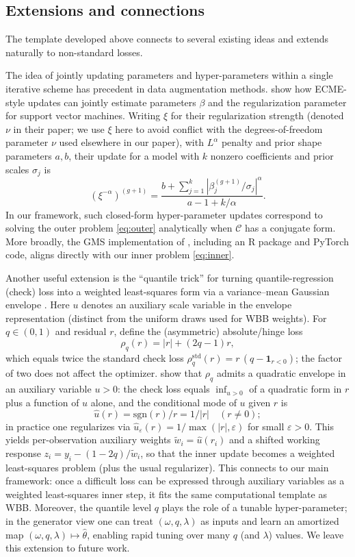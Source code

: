 \documentclass[12pt]{article}
\begin{document}


\subsection{Extensions and connections}

The template developed above connects to several existing ideas and extends naturally to non-standard losses.

The idea of jointly updating parameters and hyper-parameters within a single iterative scheme has precedent in data augmentation methods. \citet{polson2011data} show how ECME-style updates \citep{liu1994ecme} can jointly estimate parameters $\beta$ and the regularization parameter for support vector machines. Writing $\xi$ for their regularization strength (denoted $\nu$ in their paper; we use $\xi$ here to avoid conflict with the degrees-of-freedom parameter $\nu$ used elsewhere in our paper), with $L^\alpha$ penalty and prior shape parameters $a,b$, their update for a model with $k$ nonzero coefficients and prior scales $\sigma_j$ is
\[
(\xi^{-\alpha})^{(g+1)} = \dfrac{b+\sum_{j=1}^{k}|\beta_j^{(g+1)}/\sigma_j|^{\alpha}}{a-1+k/\alpha}.
\]
In our framework, such closed-form hyper-parameter updates correspond to solving the outer problem \eqref{eq:outer} analytically when $\mathcal{C}$ has a conjugate form. More broadly, the GMS implementation of \citet{shin2024generative}, including an R package and PyTorch code, aligns directly with our inner problem \eqref{eq:inner}.

Another useful extension is the ``quantile trick'' for turning quantile-regression (check) loss into a weighted least-squares form via a variance--mean Gaussian envelope \citep{polson2016mixtures}. Here $u$ denotes an auxiliary scale variable in the envelope representation (distinct from the uniform draws used for WBB weights). For $q\in(0,1)$ and residual $r$, define the (asymmetric) absolute/hinge loss
\[
\rho_q(r) = |r| + (2q-1)r,
\]
which equals twice the standard check loss $\rho_q^{\mathrm{std}}(r) = r\,(q - \mathbf{1}_{r<0})$; the factor of two does not affect the optimizer.
\citet{polson2016mixtures} show that $\rho_q$ admits a quadratic envelope in an auxiliary variable $u>0$: the check loss equals $\inf_{u>0}$ of a quadratic form in $r$ plus a function of $u$ alone, and the conditional mode of $u$ given $r$ is
\[
\hat u(r)=\mathrm{sgn}(r)/r = 1/|r| \quad (r \neq 0);
\]
in practice one regularizes via $\hat{u}_\varepsilon(r)=1/\max(|r|,\varepsilon)$ for small $\varepsilon>0$.
This yields per-observation auxiliary weights $\tilde{w}_i=\hat u(r_i)$ and a shifted working response $z_i = y_i - (1-2q)/\tilde{w}_i$, so that the inner update becomes a weighted least-squares problem (plus the usual regularizer).
This connects to our main framework: once a difficult loss can be expressed through auxiliary variables as a weighted least-squares inner step, it fits the same computational template as WBB. Moreover, the quantile level $q$ plays the role of a tunable hyper-parameter; in the generator view one can treat $(\omega,q,\lambda)$ as inputs and learn an amortized map $(\omega,q,\lambda)\mapsto \hat{\theta}$, enabling rapid tuning over many $q$ (and $\lambda$) values. We leave this extension to future work.
\end{document}
